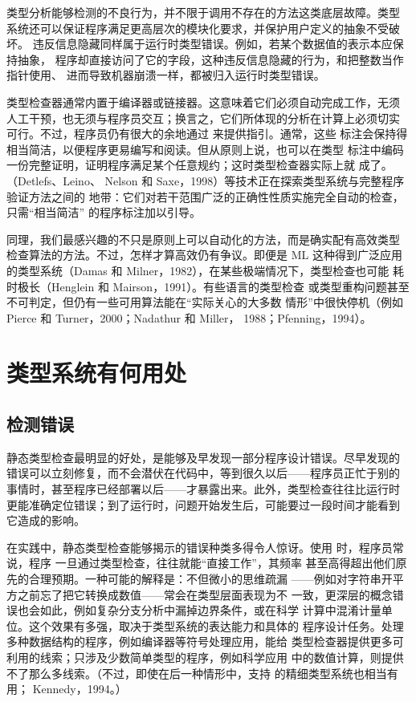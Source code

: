 类型分析能够检测的不良行为，并不限于调用不存在的方法这类底层故障。类型
系统还可以保证程序满足更高层次的模块化要求，并保护用户定义的抽象不受破坏。
违反信息隐藏同样属于运行时类型错误。例如，若某个数据值的表示本应保持抽象，
程序却直接访问了它的字段，这种违反信息隐藏的行为，和把整数当作指针使用、
进而导致机器崩溃一样，都被归入运行时类型错误。

类型检查器通常内置于编译器或链接器。这意味着它们必须自动完成工作，无须
人工干预，也无须与程序员交互；换言之，它们所体现的分析在计算上必须切实
可行。不过，程序员仍有很大的余地通过
来提供指引。通常，这些
标注会保持得相当简洁，以便程序更易编写和阅读。但从原则上说，也可以在类型
标注中编码一份完整证明，证明程序满足某个任意规约；这时类型检查器实际上就
成了。
（Detlefs、Leino、
Nelson 和 Saxe，1998）等技术正在探索类型系统与完整程序验证方法之间的
地带：它们对若干范围广泛的正确性性质实施完全自动的检查，只需“相当简洁”
的程序标注加以引导。

同理，我们最感兴趣的不只是原则上可以自动化的方法，而是确实配有高效类型
检查算法的方法。不过，怎样才算高效仍有争议。即便是 ML 这种得到广泛应用
的类型系统（Damas 和 Milner，1982），在某些极端情况下，类型检查也可能
耗时极长（Henglein 和 Mairson，1991）。有些语言的类型检查
或类型重构问题甚至不可判定，但仍有一些可用算法能在“实际关心的大多数
情形”中很快停机（例如 Pierce 和 Turner，2000；Nadathur 和 Miller，
1988；Pfenning，1994）。

\section{类型系统有何用处}
\label{sec:1.2}

\subsection*{检测错误}

静态类型检查最明显的好处，是能够及早发现一部分程序设计错误。尽早发现的
错误可以立刻修复，而不会潜伏在代码中，等到很久以后——程序员正忙于别的
事情时，甚至程序已经部署以后——才暴露出来。此外，类型检查往往比运行时
更能准确定位错误；到了运行时，问题开始发生后，可能要过一段时间才能看到
它造成的影响。

在实践中，静态类型检查能够揭示的错误种类多得令人惊讶。使用
时，程序员常说，程序
一旦通过类型检查，往往就能“直接工作”，其频率
甚至高得超出他们原先的合理预期。一种可能的解释是：不但微小的思维疏漏
——例如对字符串开平方之前忘了把它转换成数值——常会在类型层面表现为不
一致，更深层的概念错误也会如此，例如复杂分支分析中漏掉边界条件，或在科学
计算中混淆计量单位。这个效果有多强，取决于类型系统的表达能力和具体的
程序设计任务。处理多种数据结构的程序，例如编译器等符号处理应用，能给
类型检查器提供更多可利用的线索；只涉及少数简单类型的程序，例如科学应用
中的数值计算，则提供不了那么多线索。（不过，即使在后一种情形中，支持
的精细类型系统也相当有用；
Kennedy，1994。）

